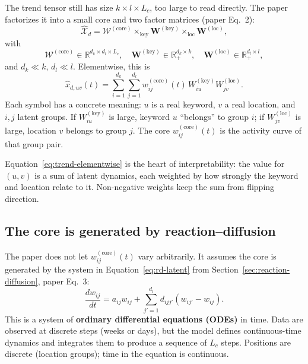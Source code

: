 The trend tensor still has size $k\times l\times L_c$, too large to read directly. The paper
factorizes it into a small core and two factor matrices (paper Eq.~2):
\begin{equation}
  \widehat{\mathcal{X}}_d
  =\mathcal{W}^{(\mathrm{core})}
   \times_{\mathrm{key}}\mathbf{W}^{(\mathrm{key})}
   \times_{\mathrm{loc}}\mathbf{W}^{(\mathrm{loc})},
  \label{eq:trend-factorization}
\end{equation}
with
\[
  \mathcal{W}^{(\mathrm{core})}\in\mathbb{R}^{d_k\times d_l\times L_c},
  \quad
  \mathbf{W}^{(\mathrm{key})}\in\mathbb{R}_{+}^{d_k\times k},
  \quad
  \mathbf{W}^{(\mathrm{loc})}\in\mathbb{R}_{+}^{d_l\times l},
\]
and $d_k\ll k$, $d_l\ll l$. Elementwise, this is
\begin{equation}
  \widehat{x}_{d,uv}(t)
  =\sum_{i=1}^{d_k}\sum_{j=1}^{d_l}
    w^{(\mathrm{core})}_{ij}(t)\,
    W^{(\mathrm{key})}_{iu}W^{(\mathrm{loc})}_{jv}.
  \label{eq:trend-elementwise}
\end{equation}
Each symbol has a concrete meaning: $u$ is a real keyword, $v$ a real location, and $i,j$ latent
groups. If $W^{(\mathrm{key})}_{iu}$ is large, keyword $u$ ``belongs'' to group $i$; if
$W^{(\mathrm{loc})}_{jv}$ is large, location $v$ belongs to group $j$. The core
$w^{(\mathrm{core})}_{ij}(t)$ is the activity curve of that group pair.

\begin{keypoint}
Equation~\eqref{eq:trend-elementwise} is the heart of interpretability: the value for $(u,v)$ is a sum
of latent dynamics, each weighted by how strongly the keyword and location relate to it. Non-negative
weights keep the sum from flipping direction.
\end{keypoint}

\subsection{The core is generated by reaction--diffusion}

The paper does not let $w^{(\mathrm{core})}_{ij}(t)$ vary arbitrarily. It assumes the core is generated
by the system in Equation~\eqref{eq:rd-latent} from Section~\ref{sec:reaction-diffusion}, paper Eq.~3:
\begin{equation}
  \frac{dw_{ij}}{dt}
  =a_{ij}w_{ij}
   +\sum_{j'=1}^{d_l}d_{ijj'}(w_{ij'}-w_{ij}).
  \label{eq:core-ode}
\end{equation}
This is a system of \textbf{ordinary differential equations (ODEs)} in time. Data are observed at
discrete steps (weeks or days), but the model defines continuous-time dynamics and integrates them to
produce a sequence of $L_c$ steps. Positions are discrete (location groups); time in the equation is
continuous.

